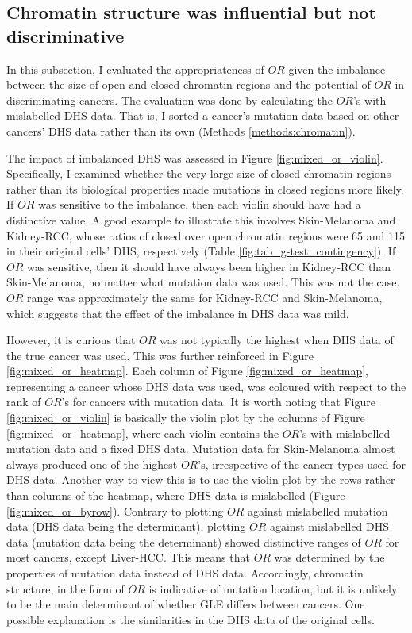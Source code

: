 \subsection{Chromatin structure was influential but not discriminative}

In this subsection, I evaluated the appropriateness of $OR$ given the imbalance between the size of open and closed chromatin regions and the potential of $OR$ in discriminating cancers. The evaluation was done by calculating the $OR$'s with mislabelled DHS data. That is, I sorted a cancer's mutation data based on other cancers' DHS data rather than its own (Methods \ref{methods:chromatin}). 

The impact of imbalanced DHS was assessed in Figure \ref{fig:mixed_or_violin}. Specifically, I examined whether the very large size of closed chromatin regions rather than its biological properties made mutations in closed regions more likely. If $OR$ was sensitive to the imbalance, then each violin should have had a distinctive value. A good example to illustrate this involves Skin-Melanoma and Kidney-RCC, whose ratios of closed over open chromatin regions were 65 and 115 in their original cells' DHS, respectively (Table \ref{fig:tab_g-test_contingency}). If $OR$ was sensitive, then it should have always been higher in Kidney-RCC than Skin-Melanoma, no matter what mutation data was used. This was not the case. $OR$ range was approximately the same for Kidney-RCC and Skin-Melanoma, which suggests that the effect of the imbalance in DHS data was mild.

However, it is curious that $OR$ was not typically the highest when DHS data of the true cancer was used. This was further reinforced in Figure \ref{fig:mixed_or_heatmap}. Each column of Figure \ref{fig:mixed_or_heatmap}, representing a cancer whose DHS data was used, was coloured with respect to the rank of $OR$'s for cancers with mutation data. It is worth noting that Figure \ref{fig:mixed_or_violin} is basically the violin plot by the columns of Figure \ref{fig:mixed_or_heatmap}, where each violin contains the $OR$'s with mislabelled mutation data and a fixed DHS data. Mutation data for Skin-Melanoma almost always produced one of the highest $OR$'s, irrespective of the cancer types used for DHS data. Another way to view this is to use the violin plot by the rows rather than columns of the heatmap, where DHS data is mislabelled (Figure \ref{fig:mixed_or_byrow}). Contrary to plotting $OR$ against mislabelled mutation data (DHS data being the determinant), plotting $OR$ against mislabelled DHS data (mutation data being the determinant) showed distinctive ranges of $OR$ for most cancers, except Liver-HCC. This means that $OR$ was determined by the properties of mutation data instead of DHS data. Accordingly, chromatin structure, in the form of $OR$ is indicative of mutation location, but it is unlikely to be the main determinant of whether GLE differs between cancers. One possible explanation is the similarities in the DHS data of the original cells.

